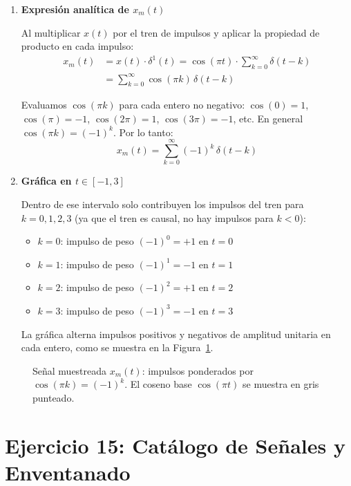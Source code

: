 \documentclass[10pt,a4paper]{article}
\begin{document}
	\begin{enumerate}[label=\textbf{\alph*)}]
		\item \textbf{Expresión analítica de $x_m(t)$}
		
		Al multiplicar $x(t)$ por el tren de impulsos y aplicar la propiedad de producto en cada impulso:
		\begin{align*}
		x_m(t) &= x(t)\cdot\delta^1(t) = \cos(\pi t)\cdot \sum_{k=0}^{\infty}\delta(t-k) \\
		       &= \sum_{k=0}^{\infty} \cos(\pi k)\,\delta(t-k)
		\end{align*}
		
		Evaluamos $\cos(\pi k)$ para cada entero no negativo: $\cos(0)=1$, $\cos(\pi)=-1$, $\cos(2\pi)=1$, $\cos(3\pi)=-1$, etc. En general $\cos(\pi k) = (-1)^k$. Por lo tanto:
		\[
		x_m(t) = \sum_{k=0}^{\infty} (-1)^k\,\delta(t-k)
		\]
		
		\item \textbf{Gráfica en $t\in[-1,3]$}
		
		Dentro de ese intervalo solo contribuyen los impulsos del tren para $k=0,1,2,3$ (ya que el tren es causal, no hay impulsos para $k<0$):
		\begin{itemize}
		    \item $k=0$: impulso de peso $(-1)^0 = +1$ en $t=0$
		    \item $k=1$: impulso de peso $(-1)^1 = -1$ en $t=1$
		    \item $k=2$: impulso de peso $(-1)^2 = +1$ en $t=2$
		    \item $k=3$: impulso de peso $(-1)^3 = -1$ en $t=3$
		\end{itemize}
		
		La gráfica alterna impulsos positivos y negativos de amplitud unitaria en cada entero, como se muestra en la Figura~\ref{fig:ejer10}.
	\end{enumerate}
	
	\begin{figure}[H]
		\centering
		
		\caption{Señal muestreada $x_m(t)$: impulsos ponderados por $\cos(\pi k) = (-1)^k$. El coseno base $\cos(\pi t)$ se muestra en gris punteado.}
		\label{fig:ejer10}
	\end{figure}

	\section*{Ejercicio 15: Catálogo de Señales y Enventanado}
	
\end{document}
